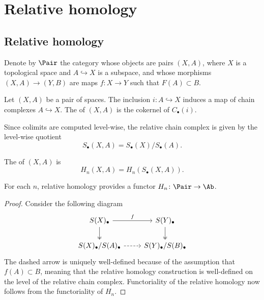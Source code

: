 \documentclass[main.tex]{subfiles}
\begin{document}
\section{Relative homology}
\label{sec:relative_homology}

\subsection{Relative homology}
\label{ssc:relative_homology}

Denote by $\Pair$ the category whose objects are pairs $(X, A)$, where $X$ is a topological space and $A \hookrightarrow X$ is a subspace, and whose morphisms $(X, A) \to (Y, B)$ are maps $f\colon X \to Y$ such that $F(A) \subset B$.

\begin{definition}
  \label{def:relative_homology}
  Let $(X, A)$ be a pair of spaces. The inclusion $i\colon A \hookrightarrow X$ induces a map of chain complexes $A \hookrightarrow X$. The  of $(X, A)$ is the cokernel of $C_{\bullet}(i)$.

  Since colimits are computed level-wise, the relative chain complex is given by the level-wise quotient
  \begin{equation*}
    S_{\bullet}(X, A) = S_{\bullet}(X) / S_{\bullet}(A).
  \end{equation*}

  The  of $(X, A)$ is
  \begin{equation*}
    H_{n}(X, A) = H_{n}(S_{\bullet}(X, A)).
  \end{equation*}
\end{definition}

\begin{lemma}
  \label{lemma:relative_homology_functorial}
  For each $n$, relative homology provides a functor $H_{n}\colon \Pair \to \Ab$.
\end{lemma}
\begin{proof}
  Consider the following diagram
  \begin{equation*}
    \begin{tikzcd}
      S(X)_{\bullet}
      \arrow[r, "f"]
      \arrow[d, two heads]
      & S(Y)_{\bullet}
      \arrow[d, two heads]
      \\
      S(X)_{\bullet}/S(A)_{\bullet}
      \arrow[r, dashed]
      & S(Y)_{\bullet}/S(B)_{\bullet}
    \end{tikzcd}
  \end{equation*}
  The dashed arrow is uniquely well-defined because of the assumption that $f(A) \subset B$, meaning that the relative homology construction is well-defined on the level of the relative chain complex. Functoriality of the relative homology now follows from the functoriality of $H_{n}$.
\end{proof}
\end{document}
